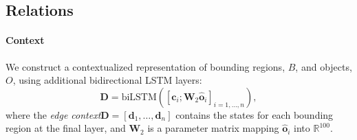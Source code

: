 \documentclass[10pt,twocolumn,letterpaper]{article}
\newcommand{\R}{\mathbb{R}}   %
\newcommand{\term}[1]{\emph{#1}}  %
\newcommand{\vect}[1]{\mathbf{#1}}   %
\newcommand{\mat}[1]{\mathbf{#1}}    %
\begin{document}
\subsection{Relations}\label{subsec:model:relations}\paragraph{Context}
We construct a contextualized representation of bounding regions, $B$, and objects, $O$, using additional bidirectional LSTM layers:
\begin{equation}
\mat{D} = \text{biLSTM}(
  [\vect{c}_i; \mat{W}_2 \vect{\hat{o}}_i]_{i=1,\ldots,n}
),
\end{equation}
where the \term{edge context}$\mat{D} = [\vect{d}_{1}, \ldots, \vect{d}_{n}]$ contains the states for each bounding region at the final layer, and $\mat{W}_2$ is a parameter matrix mapping $\vect{\hat{o}}_i$ into $\R^{100}$.
\end{document}

